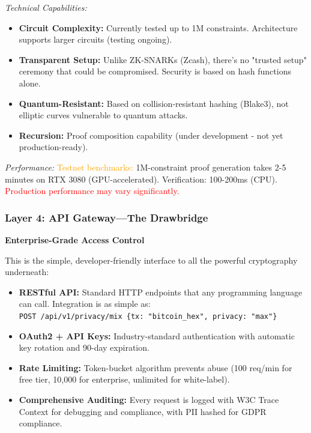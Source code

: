 \documentclass[11pt,a4paper]{article}
\begin{document}
\textit{Technical Capabilities:}
\begin{itemize}
    \item \textbf{Circuit Complexity:} Currently tested up to 1M constraints. Architecture supports larger circuits (testing ongoing).

    \item \textbf{Transparent Setup:} Unlike ZK-SNARKs (Zcash), there's no "trusted setup" ceremony that could be compromised. Security is based on hash functions alone.

    \item \textbf{Quantum-Resistant:} Based on collision-resistant hashing (Blake3), not elliptic curves vulnerable to quantum attacks.

    \item \textbf{Recursion:} Proof composition capability (under development - not yet production-ready).
\end{itemize}

\textit{Performance:} \textcolor{orange}{Testnet benchmarks:} 1M-constraint proof generation takes 2-5 minutes on RTX 3080 (GPU-accelerated). Verification: 100-200ms (CPU). \textcolor{red}{Production performance may vary significantly.}

\subsubsection{Layer 4: API Gateway—The Drawbridge}

\textbf{Enterprise-Grade Access Control}

This is the simple, developer-friendly interface to all the powerful cryptography underneath:

\begin{itemize}
    \item \textbf{RESTful API:} Standard HTTP endpoints that any programming language can call. Integration is as simple as:\\\texttt{POST /api/v1/privacy/mix \{tx: "bitcoin\_hex", privacy: "max"\}}

    \item \textbf{OAuth2 + API Keys:} Industry-standard authentication with automatic key rotation and 90-day expiration.

    \item \textbf{Rate Limiting:} Token-bucket algorithm prevents abuse (100 req/min for free tier, 10,000 for enterprise, unlimited for white-label).

    \item \textbf{Comprehensive Auditing:} Every request is logged with W3C Trace Context for debugging and compliance, with PII hashed for GDPR compliance.
\end{itemize}
\end{document}
